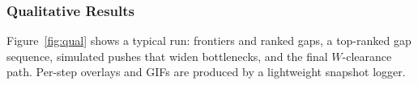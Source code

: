 

  



\subsubsection{Qualitative Results}
\label{subsec:qual}
Figure~\ref{fig:qual} shows a typical run: frontiers and ranked gaps,
a top-ranked gap sequence, simulated pushes that widen bottlenecks, and
the final $W$-clearance path. Per-step overlays and GIFs are produced by
a lightweight snapshot logger.


